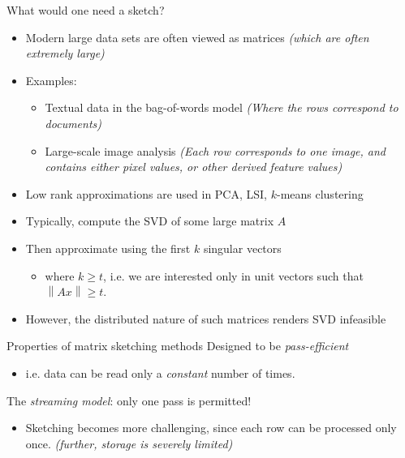 \documentclass[first=dgreen,second=purple,logo=redque]{aaltoslides}
\newcommand{\vectornorm}[1]{\left\|#1\right\|}
\begin{document}
\begin{frame}[allowframebreaks=1]{What would one need a sketch?}
\begin{itemize}
  \item Modern large data sets are often viewed as matrices
   \emph{(which are often extremely large)}
  \item{Examples:}
  \begin{itemize}
    \item Textual data in the bag-of-words model \emph{(Where the rows
    correspond to documents)}
    \item Large-scale image analysis \emph{(Each row corresponds to one image,
    and contains either pixel values, or other derived feature values)}
  \end{itemize}
  \item Low rank approximations are used in PCA, LSI, $k$-means clustering
\end{itemize}

\framebreak

\begin{itemize}
  \item Typically, compute the SVD of some large matrix $A$
  \item Then approximate using the first $k$ singular vectors
  \begin{itemize}
     \item where $k \geq t$, i.e. we are interested only in unit vectors such
     that $\vectornorm{Ax} \geq t$.
  \end{itemize}
  \item However, the distributed nature of such matrices renders SVD infeasible
\end{itemize}

\end{frame}




\begin{frame}{Properties of matrix sketching methods}
Designed to be \textit{pass-efficient}
\begin{itemize}
\item i.e. data can be read only a \textit{constant} number of times.
\end{itemize}
The \textit{streaming model}: only one pass is permitted!
\begin{itemize}
\item Sketching becomes more challenging, since each row can be processed only
once. \emph{(further, storage is severely limited)}
\end{itemize}

\end{frame}
\end{document}
